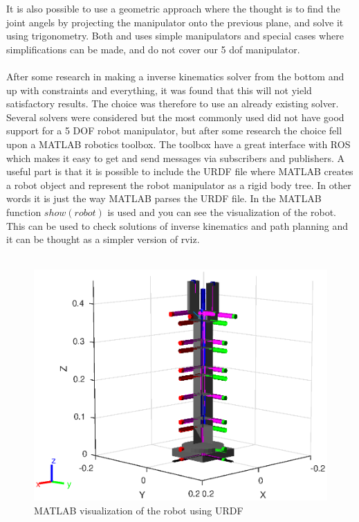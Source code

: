 It is also possible to use a geometric approach where the thought is to find the joint angels by projecting the manipulator onto the previous plane, and solve it using trigonometry\cite{spong}. Both \cite{spong} and \cite{Siciliano} uses simple manipulators and special cases where simplifications can be made, and do not cover our 5 dof manipulator.\\\\
After some research in making a inverse kinematics solver from the bottom and up with constraints and everything, it was found that this will not yield satisfactory results. The choice was therefore to use an already existing solver. Several solvers were considered but the most commonly used did not have good support for a 5 DOF robot manipulator\cite{Ikfast,kdl}, but after some research the choice fell upon a MATLAB robotics toolbox\cite{MatlabRobTool}. The toolbox have a great interface with ROS which makes it easy to get and send messages via subscribers and publishers\cite{ROSWiki,MatlabRobTool}. A useful part is that it is possible to include the URDF file where MATLAB creates a robot object and represent the robot manipulator as a rigid body tree. In other words it is just the way MATLAB parses the URDF file. In  the MATLAB function $show(robot)$ is used and you can see the visualization of the robot. This can be used to check solutions of inverse kinematics and path planning and it can be thought as a simpler version of rviz.  \\\\
\begin{figure}[htbp]
  \centering
  \includegraphics[width=.9\textwidth]{img/showRobs.eps}
  \caption{MATLAB visualization of the robot using URDF}
  \label{fig:showRovs}
\end{figure}
